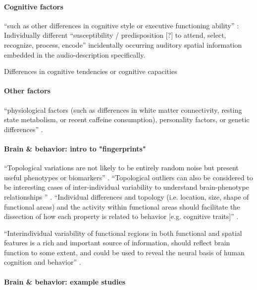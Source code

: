 \paragraph{Cognitive factors}
%
``such as other differences in cognitive style or executive functioning
ability'' \citep{vanhorn2008individual}:
%
Individually different ``susceptibility / predisposition [?] to attend, select,
recognize, process, encode'' incidentally occurring auditory spatial information
embedded in the audio-description specifically.

%
Differences in cognitive tendencies or cognitive capacities


\paragraph{Other factors}

``physiological factors (such as differences in white matter connectivity,
resting state metabolism, or recent caffeine consumption), personality factors, or genetic differences'' \citep{vanhorn2008individual}.


\paragraph{Brain \& behavior: intro to "fingerprints"}


%
``Topological variations are not likely to be entirely random noise but present
useful phenotypes or biomarkers'' \citep{vanhorn2008individual}.
%
``Topological outliers can also be considered to be interesting cases of
inter-individual variability to understand brain-phenotype relationships ''
\citep{eickhoff2018imaging}.
%
``Individual differences and topology (i.e. location, size, shape of functional
areas) and the activity within functional areas should facilitate the dissection
of how each property is related to behavior [e.g. cognitive traits]''
\citep{glasser2016multi}.

``Interindividual variability of functional regions in both functional and
spatial features is a rich and important source of information, should reflect
brain function to some extent, and could be used to reveal the neural basis of
human cognition and behavior'' \citep{zhen2015quantifying}.



\paragraph{Brain \& behavior: example studies}

